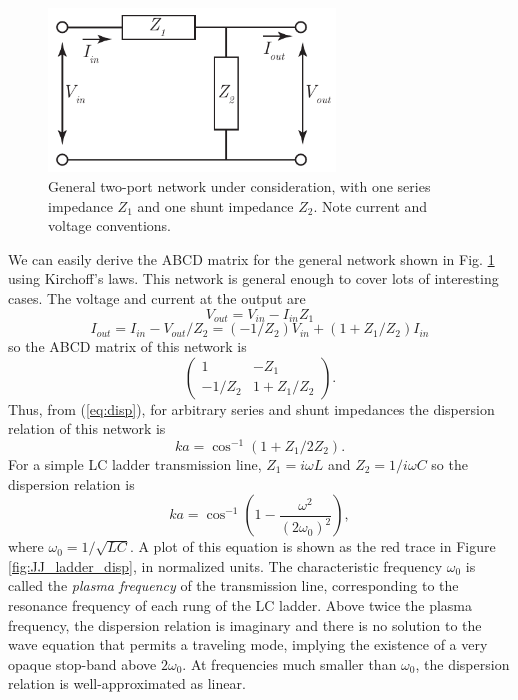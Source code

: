 \begin{figure}
\begin{center}
\includegraphics[width=3in]{twpa_theory/series_and_shunt_Z_network}
\end{center}
\caption[Generic series and shunt impedance network]{General two-port network under consideration, with one series impedance $Z_1$ and one shunt impedance $Z_2$.  Note current and voltage conventions.}
\label{fig:Znet}
\end{figure}

We can easily derive the ABCD matrix for the general network shown in Fig. \ref{fig:Znet} using Kirchoff's laws.  This network is general enough to cover lots of interesting cases.  The voltage and current at the output are
\begin{equation}
V_{out} = V_{in} - I_{in} Z_1
\label{eq:volt}
\end{equation}
\begin{equation}
I_{out} = I_{in} - V_{out}/Z_2 = (-1/Z_2)V_{in} + (1 + Z_1/Z_2) I_{in}
\label{eq:curr}
\end{equation}
so the ABCD matrix of this network is
\begin{equation}
\left( \begin{array}{cc}
1 & -Z_1 \\
-1/Z_2 & 1+Z_1/Z_2 \end{array} \right).
\label{eq:2ZABCD}
\end{equation}
Thus, from (\ref{eq:disp}), for arbitrary series and shunt impedances the dispersion relation of this network is
\begin{equation}
ka = \cos^{-1}(1 + Z_1/2Z_2).
\label{eq:twoZdisp}
\end{equation}
For a simple LC ladder transmission line, $Z_1 = i \omega L$ and $Z_2 = 1/i \omega C$ so the dispersion relation is
\begin{equation}
ka = \cos^{-1}\left(1 - \frac{\omega^2}{(2 \omega_0)^2}\right),
\label{eq:LC_ladder_disp}
\end{equation}
where $\omega_0 = 1/\sqrt{LC}$.  A plot of this equation is shown as the red trace in Figure \ref{fig:JJ_ladder_disp}, in normalized units.  The characteristic frequency $\omega_0$ is called the \textit{plasma frequency} of the transmission line, corresponding to the resonance frequency of each rung of the LC ladder.  Above twice the plasma frequency, the dispersion relation is imaginary and there is no solution to the wave equation that permits a traveling mode, implying the existence of a very opaque stop-band above $2\omega_0$.  At frequencies much smaller than $\omega_0$, the dispersion relation is well-approximated as linear.

